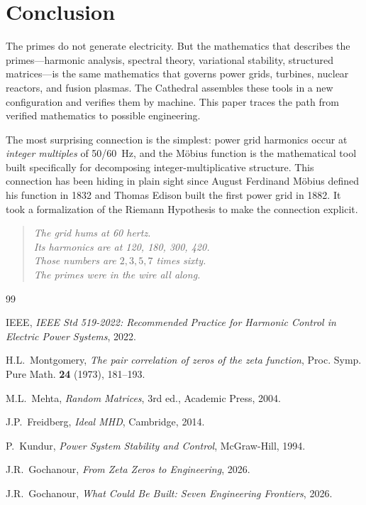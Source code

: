 \documentclass[11pt,a4paper]{article}
\begin{document}
\section{Conclusion}

The primes do not generate electricity. But the mathematics that
describes the primes---harmonic analysis, spectral theory,
variational stability, structured matrices---is the same
mathematics that governs power grids, turbines, nuclear reactors,
and fusion plasmas. The Cathedral assembles these tools in a new
configuration and verifies them by machine. This paper traces the
path from verified mathematics to possible engineering.

The most surprising connection is the simplest: power grid harmonics
occur at \emph{integer multiples} of 50/60~Hz, and the M\"obius
function is the mathematical tool built specifically for decomposing
integer-multiplicative structure. This connection has been hiding in
plain sight since August Ferdinand M\"obius defined his function in
1832 and Thomas Edison built the first power grid in 1882. It took
a formalization of the Riemann Hypothesis to make the connection
explicit.

\begin{quote}
\emph{The grid hums at 60 hertz.\\
Its harmonics are at 120, 180, 300, 420.\\
Those numbers are $2, 3, 5, 7$ times sixty.\\
The primes were in the wire all along.}
\end{quote}

\vspace{0.5cm}

\begin{thebibliography}{99}

IEEE, \emph{IEEE Std 519-2022: Recommended Practice for Harmonic
Control in Electric Power Systems}, 2022.

H.L.~Montgomery, \emph{The pair correlation of zeros of the zeta
function}, Proc. Symp. Pure Math. \textbf{24} (1973), 181--193.

M.L.~Mehta, \emph{Random Matrices}, 3rd ed., Academic Press, 2004.

J.P.~Freidberg, \emph{Ideal MHD}, Cambridge, 2014.

P.~Kundur, \emph{Power System Stability and Control}, McGraw-Hill,
1994.

J.R.~Gochanour, \emph{From Zeta Zeros to Engineering}, 2026.

J.R.~Gochanour, \emph{What Could Be Built: Seven Engineering
Frontiers}, 2026.

\end{thebibliography}
\end{document}
